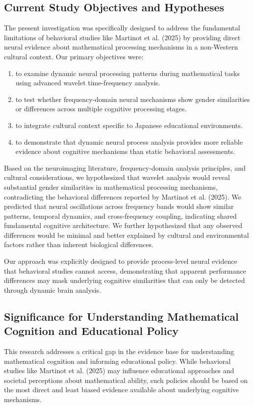 \documentclass[pdflatex,sn-nature]{sn-jnl}%
\theoremstyle{thmstyleone}%
\theoremstyle{thmstyletwo}%
\theoremstyle{thmstylethree}%
\begin{document}
\subsection{Current Study Objectives and Hypotheses}
The present investigation was specifically designed to address the fundamental limitations of behavioral studies like Martinot et al. (2025)\cite{martinot2025mathematical} by providing direct neural evidence about mathematical processing mechanisms in a non-Western cultural context. Our primary objectives were: 
\begin{enumerate}
\item to examine dynamic neural processing patterns during mathematical tasks using advanced wavelet time-frequency analysis.
\item to test whether frequency-domain neural mechanisms show gender similarities or differences across multiple cognitive processing stages.
\item to integrate cultural context specific to Japanese educational environments.
\item to demonstrate that dynamic neural process analysis provides more reliable evidence about cognitive mechanisms than static behavioral assessments.
\end{enumerate}

Based on the neuroimaging literature\cite{dehaene2003three,ansari2019mathematical}, frequency-domain analysis principles\cite{buzsaki2006rhythms,fries2005mechanism}, and cultural considerations, we hypothesized that wavelet analysis would reveal substantial gender similarities in mathematical processing mechanisms, contradicting the behavioral differences reported by Martinot et al. (2025)\cite{martinot2025mathematical}. We predicted that neural oscillations across frequency bands would show similar patterns, temporal dynamics, and cross-frequency coupling, indicating shared fundamental cognitive architecture. We further hypothesized that any observed differences would be minimal and better explained by cultural and environmental factors rather than inherent biological differences.

Our approach was explicitly designed to provide process-level neural evidence that behavioral studies cannot access, demonstrating that apparent performance differences may mask underlying cognitive similarities that can only be detected through dynamic brain analysis.


\subsection{Significance for Understanding Mathematical Cognition and Educational Policy}
This research addresses a critical gap in the evidence base for understanding mathematical cognition and informing educational policy. While behavioral studies like Martinot et al. (2025)\cite{martinot2025mathematical} may influence educational approaches and societal perceptions about mathematical ability, such policies should be based on the most direct and least biased evidence available about underlying cognitive mechanisms.
\end{document}
